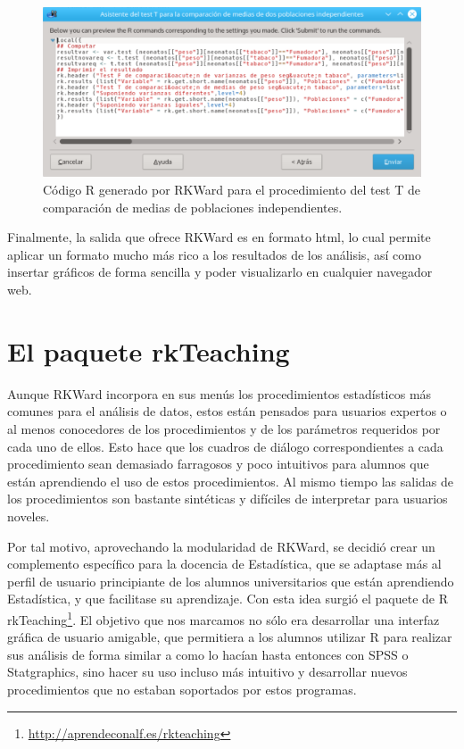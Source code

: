 \documentclass[a4paper,10pt,twoside]{article}
\newcommand{\rkteaching}{\textsf{rkTeaching}}
\newcommand{\rkward}{\textsf{RKWard}}
\newcommand{\spss}{\textsf{SPSS}}
\newcommand{\statgraphics}{\textsf{Statgraphics}}
\begin{document}
\begin{figure}[htbp!]
\centering
\includegraphics[width=\textwidth]{img/codigo_t_test.png}
\caption{Código R generado por \rkward{} para el procedimiento del test T de comparación de medias de poblaciones
independientes.}
\label{f:codigo-test-t}
\end{figure}

Finalmente, la salida que ofrece \rkward{} es en formato html, lo cual permite aplicar un formato mucho más rico a los
resultados de los análisis, así como insertar gráficos de forma sencilla y poder visualizarlo en cualquier navegador web.
 

\section{El paquete \rkteaching}
\label{s:rkteaching}
Aunque \rkward{} incorpora en sus menús los procedimientos estadísticos más comunes para el análisis de datos, estos
están pensados para usuarios expertos o al menos conocedores de los procedimientos y de los parámetros requeridos por
cada uno de ellos. 
Esto hace que los cuadros de diálogo correspondientes a cada procedimiento sean demasiado farragosos y poco intuitivos
para alumnos que están aprendiendo el uso de estos procedimientos.
Al mismo tiempo las salidas de los procedimientos son bastante sintéticas y difíciles de interpretar para usuarios
noveles. 

Por tal motivo, aprovechando la modularidad de \rkward, se decidió crear un complemento específico para la docencia de
Estadística, que se adaptase más al perfil de usuario principiante de los alumnos universitarios que están aprendiendo
Estadística, y que facilitase su aprendizaje. 
Con esta idea surgió el paquete de R \rkteaching\footnote{\url{http://aprendeconalf.es/rkteaching}}.
El objetivo que nos marcamos no sólo era desarrollar una interfaz gráfica de usuario amigable, que permitiera a los
alumnos utilizar R para realizar sus análisis de forma similar a como lo hacían hasta entonces con \spss{} o \statgraphics{},
sino hacer su uso incluso más intuitivo y desarrollar nuevos procedimientos que no estaban soportados por estos
programas. 
\end{document}
